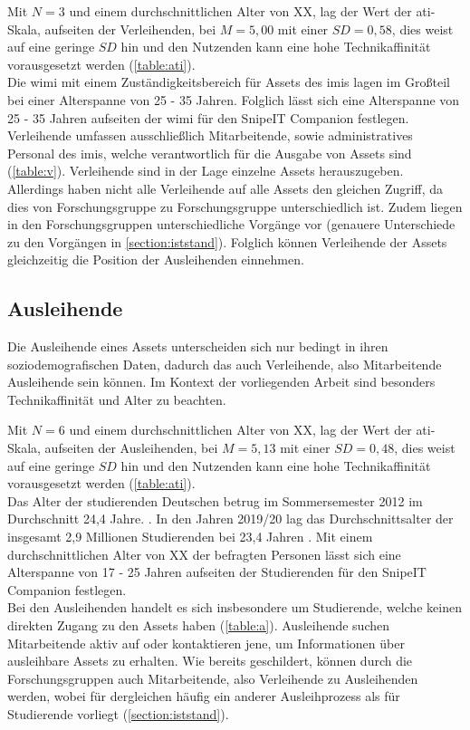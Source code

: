 Mit $N=3$ und einem durchschnittlichen Alter von XX, lag der Wert der \ac{ati}-Skala, aufseiten der
Verleihenden, bei $M=5,00$ mit einer $SD=0,58$, dies weist auf eine geringe $SD$ hin und den
Nutzenden kann eine hohe Technikaffinität vorausgesetzt werden  (\ref{table:ati}).\\
Die \ac{wimi} mit einem Zuständigkeitsbereich für Assets des \ac{imis} lagen im Großteil bei einer
Alterspanne von 25 - 35 Jahren. Folglich lässt sich eine Alterspanne von 25 - 35 Jahren aufseiten
der \ac{wimi} für den SnipeIT Companion festlegen.\\
Verleihende umfassen ausschließlich Mitarbeitende, sowie administratives Personal des \ac{imis},
welche verantwortlich für die Ausgabe von Assets sind (\ref{table:v}). Verleihende sind in der Lage
einzelne Assets herauszugeben. Allerdings haben nicht alle Verleihende auf alle Assets den gleichen
Zugriff, da dies von Forschungsgruppe zu Forschungsgruppe unterschiedlich ist. Zudem liegen in den
Forschungsgruppen unterschiedliche Vorgänge vor (genauere Unterschiede zu den Vorgängen in
\ref{section:iststand}). Folglich können Verleihende der Assets gleichzeitig die Position der
Ausleihenden einnehmen.

\subsection{Ausleihende}
Die Ausleihende eines Assets unterscheiden sich nur bedingt in ihren soziodemografischen Daten,
dadurch das auch Verleihende, also Mitarbeitende Ausleihende sein können. Im Kontext der
vorliegenden Arbeit sind besonders Technikaffinität und Alter zu beachten.

Mit $N=6$ und einem durchschnittlichen Alter von XX, lag der Wert der \ac{ati}-Skala, aufseiten der
Ausleihenden, bei $M=5,13$ mit einer $SD=0,48$, dies weist auf eine geringe $SD$ hin und den
Nutzenden kann eine hohe Technikaffinität vorausgesetzt werden  (\ref{table:ati}).\\
Das Alter der studierenden Deutschen betrug im Sommersemester 2012 im Durchschnitt 24,4
Jahre. \cite{middendorff2017wirtschaftliche}. In den Jahren 2019/20 lag das Durchschnittsalter der
insgesamt 2,9 Millionen Studierenden bei 23,4 Jahren \cite{noauthor_studierende_nodate}. Mit einem
durchschnittlichen Alter von XX der befragten Personen lässt sich eine Alterspanne von 17 - 25
Jahren aufseiten der Studierenden für den SnipeIT Companion festlegen.\\
Bei den Ausleihenden handelt es sich insbesondere um Studierende, welche keinen direkten Zugang zu
den Assets haben (\ref{table:a}). Ausleihende suchen Mitarbeitende aktiv auf oder kontaktieren jene,
um Informationen über ausleihbare Assets zu erhalten. Wie bereits geschildert, können durch die
Forschungsgruppen auch Mitarbeitende, also Verleihende zu Ausleihenden werden, wobei für dergleichen
häufig ein anderer Ausleihprozess als für Studierende vorliegt (\ref{section:iststand}). 



